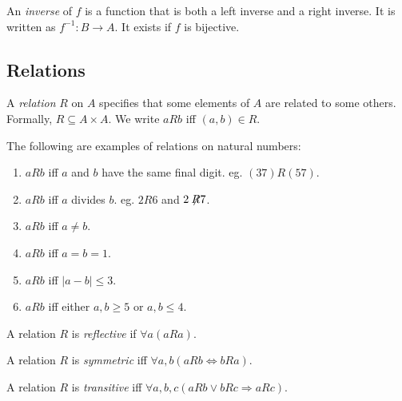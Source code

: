 \documentclass[a4paper]{article}
\begin{document}
  \begin{defi}
    An \emph{inverse} of $f$ is a function that is both a left inverse and a right inverse. It is written as $f^{-1}: B\to A$. It exists if $f$ is bijective.
  \end{defi}

  \subsection{Relations}
  \begin{defi}[Relation]
    A \emph{relation} $R$ on $A$ specifies that some elements of $A$ are related to some others. Formally, $R\subseteq A\times A$. We write $aRb$ iff $(a, b)\in R$.
  \end{defi}

  \begin{eg}
    The following are examples of relations on natural numbers:
    \begin{enumerate}
      \item $aRb$ iff $a$ and $b$ have the same final digit. eg. $(37)R(57)$.
      \item $aRb$ iff $a$ divides $b$. eg. $2R6$ and $2\not \!\!R 7$.
      \item $aRb$ iff $a\not= b$.
      \item $aRb$ iff $a = b = 1$.
      \item $aRb$ iff $|a - b|\leq 3$.
      \item $aRb$ iff either $a, b\geq 5$ or $a, b\leq 4$.
    \end{enumerate}
  \end{eg}

  \begin{defi}
    A relation $R$ is \emph{reflective} if $\forall a(aRa)$.
  \end{defi}

  \begin{defi}
    A relation $R$ is \emph{symmetric} iff $\forall a, b(aRb\Leftrightarrow bRa)$.
  \end{defi}

  \begin{defi}
    A relation $R$ is \emph{transitive} iff $\forall a, b, c(aRb\vee bRc \Rightarrow aRc)$.
  \end{defi}
\end{document}
